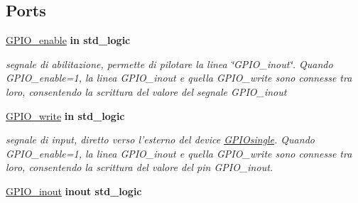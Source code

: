 \subsection*{Ports}
 \begin{DoxyCompactItemize}
\item 
\hypertarget{class_g_p_i_osingle_ga0ae7f62d9fa2c19d7ad2ad7574b58871}{\hyperlink{group___g_p_i_o-single_ga0ae7f62d9fa2c19d7ad2ad7574b58871}{G\+P\+I\+O\+\_\+enable}  {\bfseries {\bfseries \textcolor{vhdlchar}{in}\textcolor{vhdlchar}{ }}} {\bfseries \textcolor{vhdlchar}{std\+\_\+logic}\textcolor{vhdlchar}{ }} }\label{class_g_p_i_osingle_ga0ae7f62d9fa2c19d7ad2ad7574b58871}

\begin{DoxyCompactList}\small\item\em segnale di abilitazione, permette di pilotare la linea \char`\"{}\+G\+P\+I\+O\+\_\+inout\char`\"{}. Quando G\+P\+I\+O\+\_\+enable=1, la linea G\+P\+I\+O\+\_\+inout e quella G\+P\+I\+O\+\_\+write sono connesse tra loro, consentendo la scrittura del valore del segnale G\+P\+I\+O\+\_\+inout \end{DoxyCompactList}\item 
\hypertarget{class_g_p_i_osingle_ga20547939f304c722cb29df650d7ca7ef}{\hyperlink{group___g_p_i_o-single_ga20547939f304c722cb29df650d7ca7ef}{G\+P\+I\+O\+\_\+write}  {\bfseries {\bfseries \textcolor{vhdlchar}{in}\textcolor{vhdlchar}{ }}} {\bfseries \textcolor{vhdlchar}{std\+\_\+logic}\textcolor{vhdlchar}{ }} }\label{class_g_p_i_osingle_ga20547939f304c722cb29df650d7ca7ef}

\begin{DoxyCompactList}\small\item\em segnale di input, diretto verso l'esterno del device \hyperlink{class_g_p_i_osingle}{G\+P\+I\+Osingle}. Quando G\+P\+I\+O\+\_\+enable=1, la linea G\+P\+I\+O\+\_\+inout e quella G\+P\+I\+O\+\_\+write sono connesse tra loro, consentendo la scrittura del valore del pin G\+P\+I\+O\+\_\+inout. \end{DoxyCompactList}\item 
\hypertarget{class_g_p_i_osingle_ga979707b3e6ce3920d653c07c91e80f70}{\hyperlink{group___g_p_i_o-single_ga979707b3e6ce3920d653c07c91e80f70}{G\+P\+I\+O\+\_\+inout}  {\bfseries {\bfseries \textcolor{vhdlchar}{inout}\textcolor{vhdlchar}{ }}} {\bfseries \textcolor{vhdlchar}{std\+\_\+logic}\textcolor{vhdlchar}{ }} }\label{class_g_p_i_osingle_ga979707b3e6ce3920d653c07c91e80f70}


\end{DoxyCompactItemize}
